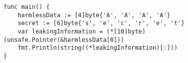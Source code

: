 \begin{lstlisting}[language=Golang, label=lst:information-leak, caption=Buffer information leak proof of concept]
func main() {
    harmlessData := [4]byte{'A', 'A', 'A', 'A'}
    secret := [6]byte{'s', 'e', 'c', 'r', 'e', 't'}
    var leakingInformation = (*[10]byte)(unsafe.Pointer(&harmlessData[0]))
    fmt.Println(string((*leakingInformation)[:]))
}
\end{lstlisting}